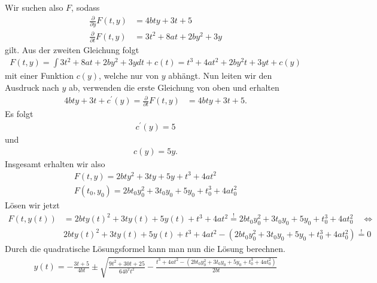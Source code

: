 \begin{solution}
\begin{enumerate}[label = \textbf{\alph*)}]
Wir suchen also $F$, sodass
\begin{align*}
  \frac{\partial}{\partial y}F(t,y) &= 4bty + 3t + 5 \\
  \frac{\partial}{\partial t}F(t,y) &= 3t^2 + 8at + 2by^2 + 3y
\end{align*}
gilt. Aus der zweiten Gleichung folgt
\begin{align*}
  F(t,y) = \int 3t^2 + 8at + 2by^2 + 3y dt + c(t) = t^3 +4at^2 + 2by^2 t +3yt + c(y)
\end{align*}
mit einer Funktion $c(y)$, welche nur von $y$ abhängt.
Nun leiten wir den Ausdruck nach $y$ ab, verwenden die erste Gleichung von oben
und erhalten
\begin{align*}
  4bty + 3t + c^{\prime}(y) = \frac{\partial}{\partial t}F(t,y) &= 4bty + 3t + 5.
\end{align*}
Es folgt
\begin{align*}
  c^{\prime}(y) =  5
\end{align*}
und
\begin{align*}
  c(y) = 5y.
\end{align*}
Insgesamt erhalten wir also
\begin{align*}
  F(t,y) = 2bty^2 + 3ty + 5y + t^3 + 4at^2\\
  F(t_0 , y_0 ) = 2bt_0 y_0^2 + 3t_0 y_0 + 5y_0 + t_0^3 + 4at_0^2
\end{align*}
Lösen wir jetzt
\begin{align*}
  F(t,y(t)) &= 2bty(t)^2 + 3ty(t) + 5y(t) + t^3 + 4at^2 \stackrel{!}{=}
  2bt_0 y_0^2 + 3t_0 y_0 + 5y_0 + t_0^3 + 4at_0^2 \quad \Leftrightarrow \\
  &2bty(t)^2 + 3ty(t) + 5y(t) + t^3 + 4at^2 - (2bt_0 y_0^2 + 3t_0 y_0 + 5y_0 + t_0^3 + 4at_0^2)
  \stackrel{!}{=} 0
\end{align*}
Durch die quadratische Lösungsformel kann man nun die Lösung berechnen.
\begin{align*}
  y(t) = - \frac{3t +5}{4bt} \pm \sqrt{\frac{9t^2 + 30t + 25}{64b^2 t^2} - \frac{t^3 + 4at^2 - (2bt_0 y_0^2 + 3t_0 y_0 + 5y_0 + t_0^3 + 4at_0^2)}{2bt}}
\end{align*}
\end{enumerate}
\end{solution}
